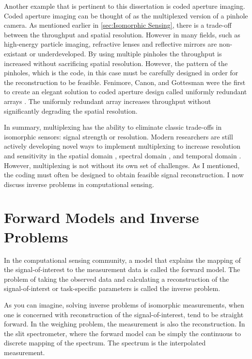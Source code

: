 Another example that is pertinent to this dissertation is coded aperture imaging. Coded aperture imaging can be thought of as the multiplexed version of a pinhole camera. As mentioned earlier in \autoref{sec:Isomorphic Sensing}, there is a trade-off between the throughput and spatial resolution. However in many fields, such as high-energy particle imaging, refractive lenses and reflective mirrors are non-existant or underdeveloped. By using multiple pinholes the throughput is increased without sacrificing spatial resolution. However, the pattern of the pinholes, which is the code, in this case must be carefully designed in order for the reconstruction to be feasible. Fenimore, Canon, and Gottesman were the first to create an elegant solution to coded aperture design called uniformly redundant arrays \cite{fenimore1978coded, gottesman1989new}. The uniformly redundant array increases throughput without significantly degrading the spatial resolution. 

In summary, multiplexing has the ability to eliminate classic trade-offs in isomorphic sensors: signal strength or resolution. Modern researchers are still actively developing novel ways to implement multiplexing to increase resolution and sensitivity in the spatial domain \cite{duarte2008single, townsend2012static}, spectral domain \cite{gehm2006static, tsai2013coded}, and temporal domain \cite{holloway2012flutter,llull2013coded}. However, multiplexing is not without its own set of challenges. As I mentioned, the coding must often be designed to obtain feasible signal reconstruction. I now discuss inverse problems in computational sensing.

\section{Forward Models and Inverse Problems}

In the computational sensing community, a model that explains the mapping of the signal-of-interest to the measurement data is called the \gls{forward model}. The problem of taking the observed data and calculating a reconstruction of the signal-of-interst or task-specific parameters is called the \gls{inverse problem}.

As you can imagine, solving inverse problems of isomorphic measurements, when one is concerned with reconstruction of the signal-of-interest, tend to be straight forward. In the weighing problem, the measurement is also the reconstruction. In the slit spectrometer, where the forward model can be simply the continuous to discrete mapping of the spectrum. The spectrum is the interpolated measurement. 

